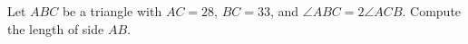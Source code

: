 Let $ABC$ be a triangle with $AC = 28$, $BC = 33$, and $\angle ABC = 2\angle ACB$. Compute the length of side $AB$.